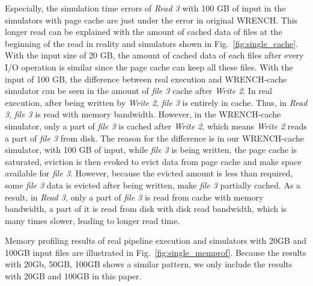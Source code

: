 \documentclass[conference]{IEEEtran}
\newcommand{\tristan}[1]{\color{orange}\textbf{From Tristan:}#1\color{black}}
\begin{document}
        Especially, the simulation time errors of \textit{Read 3} with 100 GB of input
        in the simulators with page cache are just under the error in original WRENCH.
        This longer read can be explained with the amount of cached data of files
        at the beginning of the read in reality and simulators shown in
        Fig.~\ref{fig:single_cache}.
        With the input size of 20 GB, the amount of cached data of each files after 
        every I/O operation is similar since the page cache can keep all these files.
        With the input of 100 GB, the difference between real execution and WRENCH-cache
        simulator can be seen in the amount of \textit{file 3} cache after \textit{Write 2}.
        In real execution, after being written by \textit{Write 2},
        \textit{file 3} is entirely in cache.
        Thus, in \textit{Read 3}, \textit{file 3} is read with memory bandwidth.
        However, in the WRENCH-cache simulator, only a part of \textit{file 3} is
        cached after \textit{Write 2}, which means \textit{Write 2} reads a part of
        \textit{file 3} from disk.
        The reason for the difference is in our WRENCH-cache simulator,
        with 100 GB of input, while \textit{file 3} is being written,
        the page cache is saturated, eviction is then evoked to evict data
        from page cache and make space available for \textit{file 3}.
        However, because the evicted amount is less than required,
        some \textit{file 3} data is evicted after being written, make \textit{file 3}
        partially cached.
        As a result, in \textit{Read 3}, only a part of \textit{file 3} is read from cache
        with memory bandwidth, a part of it is read from disk with disk read bandwidth,
        which is many times slower, leading to longer read time.


            Memory profiling results of real pipeline execution and simulators 
            with 20GB and 100GB input files are illustrated in Fig.~\ref{fig:single_memprof}.
            Because the results with 20Gb, 50GB, 100GB shows a similar pattern,
            we only include the results with 20GB and 100GB in this paper.
\end{document}
